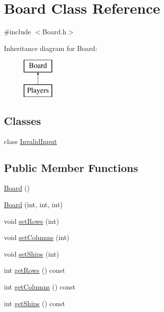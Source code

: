 \hypertarget{class_board}{\section{Board Class Reference}
\label{class_board}
}


{\ttfamily \#include $<$Board.\+h$>$}

Inheritance diagram for Board\+:\begin{figure}[H]
\begin{center}
\leavevmode
\includegraphics[height=2.000000cm]{class_board}
\end{center}
\end{figure}
\subsection*{Classes}
\begin{DoxyCompactItemize}
\item 
class \hyperlink{class_board_1_1_invalid_input}{Invalid\+Input}
\end{DoxyCompactItemize}
\subsection*{Public Member Functions}
\begin{DoxyCompactItemize}
\item 
\hyperlink{class_board_a9ee491d4fea680cf69b033374a9fdfcb}{Board} ()
\item 
\hyperlink{class_board_a299f62d90ba5fbdc8440bfe308b8a8aa}{Board} (int, int, int)
\item 
void \hyperlink{class_board_a6ad160481be18744397f962ee8e4d814}{set\+Rows} (int)
\item 
void \hyperlink{class_board_adccbab14197ba03304e799fe840e4992}{set\+Columns} (int)
\item 
void \hyperlink{class_board_aff7bda31a5f7cc05889b5ac1b81b2b7e}{set\+Ships} (int)
\item 
int \hyperlink{class_board_a80079a2b2bdec57b229bf110ce79c5ef}{get\+Rows} () const 
\item 
int \hyperlink{class_board_a2fafe4b1b84a90291594db2bef616619}{get\+Columns} () const 
\item 
int \hyperlink{class_board_a0a3f08f39f671639eacf531225b99eba}{get\+Ships} () const 
\end{DoxyCompactItemize}


